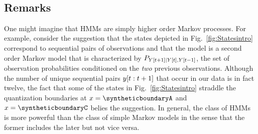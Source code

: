 \begin{table}[htb]
  \caption[Words most frequently associated with each state.]%
  {Words most frequently associated with each state.  While we have no
    interpretation for some of the states, the following
    interpretations of other states are plausible.}
  \begin{center}{\footnotesize%
      \\[2.0ex]
      
    }\end{center}
  \label{tab:POS}
\end{table}

\subsection{Remarks}
\label{sec:DHMMRemarks}

One might imagine that HMMs are simply higher order Markov processes.
For example, consider the suggestion that the states depicted in
Fig.~\ref{fig:Statesintro} correspond to sequential pairs of
observations and that the model is a second order Markov model that is
characterized by $P_{{Y}{[t+1]}\mid {Y}{[t]},{Y}{[t-1]}}$, the set of
observation probabilities conditioned on the \emph{two} previous
observations.  Although the number of unique sequential pairs
$y[t:t+1]$ that occur in our data is in fact twelve, the fact
that some of the states in Fig.~\ref{fig:Statesintro} straddle the
quantization boundaries at $x = \syntheticboundaryA$ and
$x=\syntheticboundaryC$ belies the suggestion.  In general, the class
of HMMs is more powerful than the class of simple Markov models in the
sense that the former includes the later but not vice versa.

